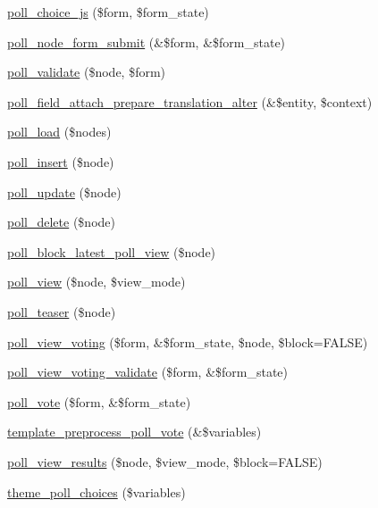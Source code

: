 \begin{DoxyCompactItemize}
\item 
\hyperlink{poll_8module_a31f17036375b3e47f128839d9c4b11b9}{poll\_\-choice\_\-js} (\$form, \$form\_\-state)
\item 
\hyperlink{poll_8module_a15040a8b0629fe567cbb1b7313c2368f}{poll\_\-node\_\-form\_\-submit} (\&\$form, \&\$form\_\-state)
\item 
\hyperlink{poll_8module_a42c8123c32a91678ef00d3f09be16a3e}{poll\_\-validate} (\$node, \$form)
\item 
\hyperlink{poll_8module_a9cc51afbc7581dda213bbc409e8b3419}{poll\_\-field\_\-attach\_\-prepare\_\-translation\_\-alter} (\&\$entity, \$context)
\item 
\hyperlink{poll_8module_afe0b2c5187bd16fa04a1ca8133fdd782}{poll\_\-load} (\$nodes)
\item 
\hyperlink{poll_8module_ad302f1defb634370507bb6e4faf99a77}{poll\_\-insert} (\$node)
\item 
\hyperlink{poll_8module_a12844962a2a54fcd508fd1284d22e6aa}{poll\_\-update} (\$node)
\item 
\hyperlink{poll_8module_a65b1706919a5825906bfdb855e75e6d6}{poll\_\-delete} (\$node)
\item 
\hyperlink{poll_8module_a83fcbc228432e337e7a20ec1c7f63029}{poll\_\-block\_\-latest\_\-poll\_\-view} (\$node)
\item 
\hyperlink{poll_8module_a00b8e97faf78018321120f381270c90a}{poll\_\-view} (\$node, \$view\_\-mode)
\item 
\hyperlink{poll_8module_a429acb5ea44409fe3c93d8765172c9bd}{poll\_\-teaser} (\$node)
\item 
\hyperlink{group__forms_gace728421201ee0db5c34bfadcf11c4cc}{poll\_\-view\_\-voting} (\$form, \&\$form\_\-state, \$node, \$block=FALSE)
\item 
\hyperlink{poll_8module_ab78955289cb1d2d7cd2b81f5df302cf2}{poll\_\-view\_\-voting\_\-validate} (\$form, \&\$form\_\-state)
\item 
\hyperlink{poll_8module_a93d35efa34833d1b825d657bc5f26195}{poll\_\-vote} (\$form, \&\$form\_\-state)
\item 
\hyperlink{poll_8module_a480046f67169f2b0d86b0b6c3cb506da}{template\_\-preprocess\_\-poll\_\-vote} (\&\$variables)
\item 
\hyperlink{poll_8module_a6ad9f596a691216178d2686e6e73ee85}{poll\_\-view\_\-results} (\$node, \$view\_\-mode, \$block=FALSE)
\item 
\hyperlink{group__themeable_ga1959b73825b215f08bf6e91d5b9f66b4}{theme\_\-poll\_\-choices} (\$variables)
\item 

\end{DoxyCompactItemize}
